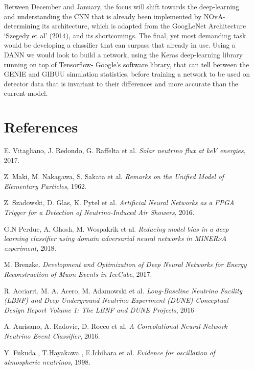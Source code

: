 \documentclass[11pt]{article}
\begin{document}
Between December and January, the focus will shift towards the deep-learning and understanding the CNN that is already been implemented by NOvA- determining its architecture, which is adapted from the GoogLeNet Architecture ‘Szegedy et al’ (2014), and its shortcomings. The final, yet most demanding task would be developing a classifier that can surpass that already in use. Using a DANN we would look to build a network, using the Keras deep-learning library running on top of Tensorflow- Google's software library, that can tell between the GENIE and GIBUU simulation statistics, before training a network to be used on detector data that is invariant to their differences and more accurate than the current model.  

\bigskip
\bigskip
\bigskip

\bigskip
\bigskip
\bigskip


\bigskip
\bigskip
\bigskip

\section*{References}

\noindent
E. Vitagliano, J. Redondo, G. Raffelta et al. \textit{Solar neutrino flux at keV energies}, 2017. \bigskip

\noindent
Z. Maki, M. Nakagawa, S. Sakata et al. \textit{Remarks on the Unified Model of Elementary Particles}, 1962. \smallskip 

\noindent
Z. Szadowski, D. Glas, K. Pytel et al. \textit{Artificial Neural Networks as a FPGA Trigger for a Detection of Neutrino-Induced Air Showers}, 2016.\bigskip

\noindent
G.N Perdue, A. Ghosh, M. Wospakrik  et al. \textit{Reducing model bias in a deep learning classifier using domain adversarial neural networks in MINER$\nu$A experiment}, 2018.\bigskip

\noindent
M. Brenzke. \textit{Development and Optimization of Deep Neural Networks for Energy Reconstruction of Muon Events in IceCube}, 2017.\bigskip

\noindent
R. Acciarri, M. A. Acero, M. Adamowski et al. \textit{Long-Baseline Neutrino Facility (LBNF) and Deep Underground Neutrino Experiment (DUNE) Conceptual Design Report Volume 1: The LBNF and DUNE Projects}, 2016 \bigskip

\noindent
A. Aurisano, A. Radovic, D. Rocco et al. \textit{A Convolutional Neural Network Neutrino Event Classifier}, 2016.\bigskip

\noindent
Y. Fukuda , T.Hayakawa , E.Ichihara et al. \textit{Evidence for oscillation of atmospheric neutrinos}, 1998.\bigskip
\end{document}
